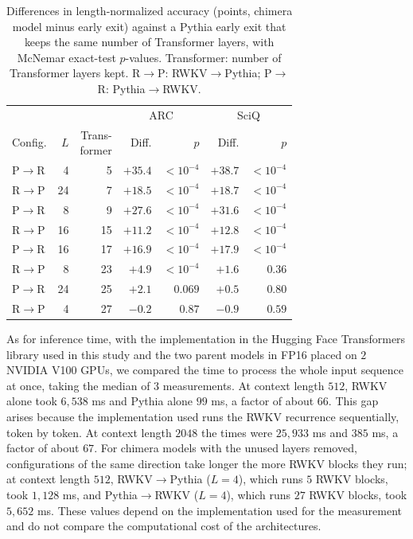 \documentclass[conference]{IEEEtran}
\newcommand{\RtoP}{RWKV$\to$\allowbreak Pythia}
\newcommand{\PtoR}{Pythia$\to$\allowbreak RWKV}
\newcommand{\RtoPL}[1]{\RtoP{} ($L{=}#1$)}
\newcommand{\PtoRL}[1]{\PtoR{} ($L{=}#1$)}
\begin{document}
\begin{table}[!t]\centering\small
\caption{Differences in length-normalized accuracy (points, chimera model minus early exit) against a Pythia early exit that keeps the same number of Transformer layers, with McNemar exact-test $p$-values. Transformer: number of Transformer layers kept. R$\to$P: RWKV$\to$Pythia; P$\to$R: Pythia$\to$RWKV.}\label{tab:earlyexit}
\setlength{\tabcolsep}{3pt}
\begin{tabular}{lrrrrrr}\toprule
& & & \multicolumn{2}{c}{ARC} & \multicolumn{2}{c}{SciQ}\\
\cmidrule(lr){4-5}\cmidrule(lr){6-7}
Config. & $L$ & \shortstack{Trans-\\former} & Diff. & $p$ & Diff. & $p$\\\midrule
P$\to$R & 4  & 5  & $+35.4$ & $<10^{-4}$ & $+38.7$ & $<10^{-4}$\\
R$\to$P & 24 & 7  & $+18.5$ & $<10^{-4}$ & $+18.7$ & $<10^{-4}$\\
P$\to$R & 8  & 9  & $+27.6$ & $<10^{-4}$ & $+31.6$ & $<10^{-4}$\\
R$\to$P & 16 & 15 & $+11.2$ & $<10^{-4}$ & $+12.8$ & $<10^{-4}$\\
P$\to$R & 16 & 17 & $+16.9$ & $<10^{-4}$ & $+17.9$ & $<10^{-4}$\\
R$\to$P & 8  & 23 & $+4.9$ & $<10^{-4}$ & $+1.6$ & $0.36$\\
P$\to$R & 24 & 25 & $+2.1$ & $0.069$ & $+0.5$ & $0.80$\\
R$\to$P & 4  & 27 & $-0.2$ & $0.87$ & $-0.9$ & $0.59$\\\bottomrule
\end{tabular}
\end{table}

As for inference time, with the implementation in the Hugging Face Transformers library used in this study and the two parent models in FP16
placed on $2$ NVIDIA V100 GPUs, we compared the time to process the whole input sequence at once, taking the median of $3$ measurements. At context length $512$, RWKV alone took $6{,}538$ ms and Pythia alone
$99$ ms, a factor of about $66$. This gap arises because the implementation used runs the RWKV recurrence
sequentially, token by token. At context length $2048$ the times were $25{,}933$ ms and $385$ ms, a factor of about $67$.
For chimera models with the unused layers removed, configurations of the same direction take longer the more RWKV blocks they run;
at context length $512$, \RtoPL{4},
which runs $5$ RWKV blocks, took $1{,}128$ ms, and \PtoRL{4}, which runs $27$ RWKV blocks, took $5{,}652$ ms.
These values depend on the implementation used for the measurement and do not compare the computational cost of the architectures.
\end{document}
